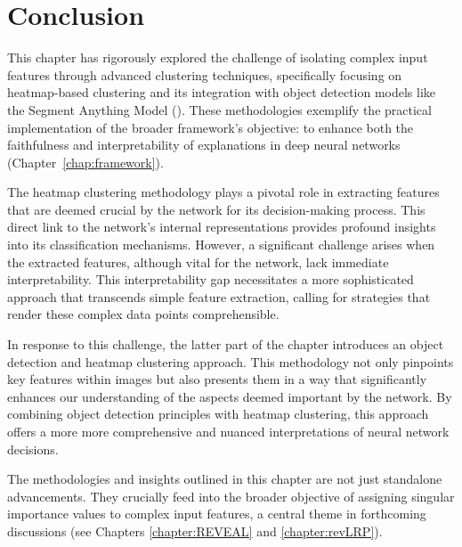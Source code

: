 \section{Conclusion}

This chapter has rigorously explored the challenge of isolating complex input features through advanced clustering techniques, specifically focusing on heatmap-based clustering and its integration with object detection models like the Segment Anything Model (\SAM). These methodologies exemplify the practical implementation of the broader framework’s objective: to enhance both the faithfulness and interpretability of explanations in deep neural networks (Chapter~\ref{chap:framework}).

The heatmap clustering methodology plays a pivotal role in extracting features that are deemed crucial by the network for its decision-making process. This direct link to the network’s internal representations provides profound insights into its classification mechanisms. However, a significant challenge arises when the extracted features, although vital for the network, lack immediate interpretability. This interpretability gap necessitates a more sophisticated approach that transcends simple feature extraction, calling for strategies that render these complex data points comprehensible.

In response to this challenge, the latter part of the chapter introduces an object detection and heatmap clustering approach. This methodology not only pinpoints key features within images but also presents them in a way that significantly enhances our understanding of the aspects deemed important by the network. By combining object detection principles with heatmap clustering, this approach offers a more more comprehensive and nuanced interpretations of neural network decisions.

The methodologies and insights outlined in this chapter are not just standalone advancements. They crucially feed into the broader objective of assigning singular importance values to complex input features, a central theme in forthcoming discussions (see Chapters \ref{chapter:REVEAL} and \ref{chapter:revLRP}).